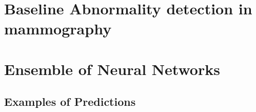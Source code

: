 \documentclass{book}
\begin{document}

    \chapter{Baseline Abnormality detection in mammography}


    \chapter{Ensemble of Neural Networks}
    \section{Examples of Predictions}

\end{document}
